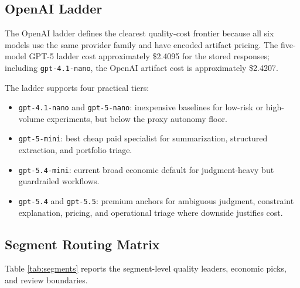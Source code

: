 \documentclass[11pt]{article}
\newcommand{\code}[1]{\texttt{#1}}
\begin{document}
\subsection{OpenAI Ladder}

The OpenAI ladder defines the clearest quality-cost frontier because all six models use the same provider family and have encoded artifact pricing. The five-model GPT-5 ladder cost approximately \$2.4095 for the stored responses; including \code{gpt-4.1-nano}, the OpenAI artifact cost is approximately \$2.4207.

The ladder supports four practical tiers:

\begin{itemize}[leftmargin=*]
  \item \code{gpt-4.1-nano} and \code{gpt-5-nano}: inexpensive baselines for low-risk or high-volume experiments, but below the proxy autonomy floor.
  \item \code{gpt-5-mini}: best cheap paid specialist for summarization, structured extraction, and portfolio triage.
  \item \code{gpt-5.4-mini}: current broad economic default for judgment-heavy but guardrailed workflows.
  \item \code{gpt-5.4} and \code{gpt-5.5}: premium anchors for ambiguous judgment, constraint explanation, pricing, and operational triage where downside justifies cost.
\end{itemize}

\subsection{Segment Routing Matrix}

Table \ref{tab:segments} reports the segment-level quality leaders, economic picks, and review boundaries.
\end{document}
